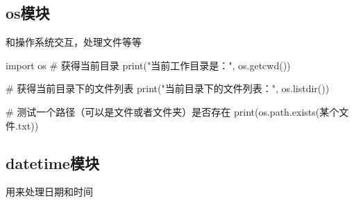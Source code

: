 \documentclass[
  letterpaper,
  DIV=11,
  numbers=noendperiod]{scrreprt}
\newenvironment{Shaded}{\begin{snugshade}}{\end{snugshade}}
\newcommand{\BuiltInTok}[1]{\textcolor[rgb]{0.00,0.23,0.31}{#1}}
\newcommand{\CommentTok}[1]{\textcolor[rgb]{0.37,0.37,0.37}{#1}}
\newcommand{\ImportTok}[1]{\textcolor[rgb]{0.00,0.46,0.62}{#1}}
\newcommand{\NormalTok}[1]{\textcolor[rgb]{0.00,0.23,0.31}{#1}}
\newcommand{\StringTok}[1]{\textcolor[rgb]{0.13,0.47,0.30}{#1}}
\begin{document}
\hypertarget{osux6a21ux5757}{%
\subsection{os模块}\label{osux6a21ux5757}}

和操作系统交互，处理文件等等

\begin{Shaded}
\begin{Highlighting}[]
\ImportTok{import}\NormalTok{ os}
\CommentTok{\# 获得当前目录}
\BuiltInTok{print}\NormalTok{(}\StringTok{"当前工作目录是："}\NormalTok{, os.getcwd())}

\CommentTok{\# 获得当前目录下的文件列表}
\BuiltInTok{print}\NormalTok{(}\StringTok{"当前目录下的文件列表："}\NormalTok{, os.listdir())}

\CommentTok{\# 测试一个路径（可以是文件或者文件夹）是否存在}
\BuiltInTok{print}\NormalTok{(os.path.exists(}\StringTok{\textquotesingle{}某个文件.txt\textquotesingle{}}\NormalTok{))}
\end{Highlighting}
\end{Shaded}

\hypertarget{datetimeux6a21ux5757}{%
\subsection{datetime模块}\label{datetimeux6a21ux5757}}

用来处理日期和时间
\end{document}

